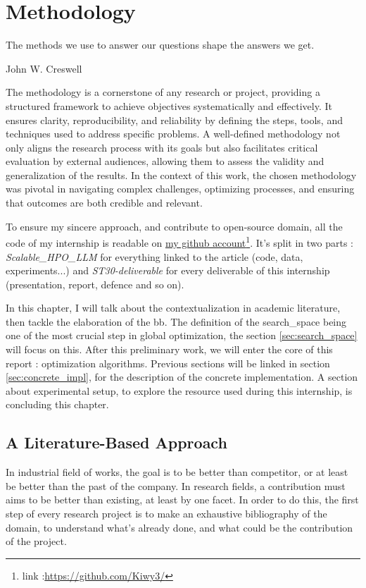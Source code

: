 \chapter{Methodology}
\label{chap:methodo}

\epigraph{The methods we use to answer our questions shape the answers we get.}{John W. Creswell}

The methodology is a cornerstone of any research or project, providing a structured framework to achieve objectives systematically and effectively. It ensures clarity, reproducibility, and reliability by defining the steps, tools, and techniques used to address specific problems. A well-defined methodology not only aligns the research process with its goals but also facilitates critical evaluation by external audiences, allowing them to assess the validity and generalization of the results. In the context of this work, the chosen methodology was pivotal in navigating complex challenges, optimizing processes, and ensuring that outcomes are both credible and relevant.

To ensure my sincere approach, and contribute to open-source domain, all the code of my internship is readable on \href{https://github.com/Kiwy3}{my github account}\footnote{link :\url{https://github.com/Kiwy3/}}. It's split in two parts : \textit{Scalable\_HPO\_LLM} for everything linked to the article (code, data, experiments...) and \textit{ST30-deliverable} for every deliverable of this internship (presentation, report, defence and so on).

In this chapter, I will talk about the contextualization in academic literature, then tackle the elaboration of the \gls{bb}. The definition of the \gls{search_space}  being one of the most crucial step in global optimization, the section \ref{sec:search_space} will focus on this. After this preliminary work, we will enter the core of this report : optimization algorithms. Previous sections will be linked in section \ref{sec:concrete_impl}, for the description of the concrete implementation. A section about experimental setup, to explore the resource used during this internship, is concluding this chapter.


\section{A Literature-Based Approach}
\label{sec:litterature}
In industrial field of works, the goal is to be better than competitor, or at least be better than the past of the company. In research fields, a contribution must aims to be better than existing, at least by one facet. In order to do this, the first step of every research project is to make an exhaustive bibliography of the domain, to understand what's already done, and what could be the contribution of the project. 

